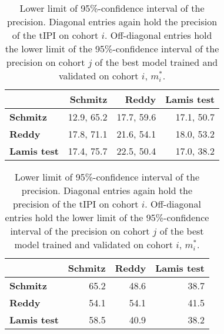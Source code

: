 \begin{table}
    \centering
    \begin{subtable}{\textwidth}
        \centering
        \begin{tabular}{lrrr}
            \hline
            & \textbf{Schmitz} & \textbf{Reddy} & \textbf{Lamis test} \\
            \hline
            \textbf{Schmitz} & \num{12.9}, \num{65.2} & \num{17.7}, \num{59.6} & \num{17.1}, \num{50.7} \\
            \textbf{Reddy} & \num{17.8}, \num{71.1} & \num{21.6}, \num{54.1} & \num{18.0}, \num{53.2} \\
            \textbf{Lamis test} & \num{17.4}, \num{75.7} & \num{22.5}, \num{50.4} & \num{17.0}, \num{38.2} \\
            \hline
        \end{tabular}
        \caption{Prevalence and precision.
            Diagonal entries $(i, i)$ hold prevalence, precision of the $\text{tIPI}$ on 
            cohort $i$. Off-diagonal entries $(i, j)$ hold prevalence, precision on cohort $j$ of 
            the best model trained and validated on cohort $i$, $m_i^*$.}\label{subtab:inter-prev-prec}
    \end{subtable}

    \vspace{0.5cm}
    \begin{subtable}{\textwidth}
        \centering
        \begin{tabular}{lrrr}
            \hline
            & \textbf{Schmitz} & \textbf{Reddy} & \textbf{Lamis test} \\
            \hline
            \textbf{Schmitz} & \num{65.2} & \num{48.6} & \num{38.7} \\
            \textbf{Reddy} & \num{54.1} & \num{54.1} & \num{41.5} \\
            \textbf{Lamis test} & \num{58.5} & \num{40.9} & \num{38.2} \\
            \hline
        \end{tabular}
        \caption{Lower limit of \num{95}\%-confidence interval of the precision.
            Diagonal entries again hold the precision of the $\text{tIPI}$ on cohort $i$. Off-diagonal 
            entries hold the lower limit of the \num{95}\%-confidence interval of the precision on 
            cohort $j$ of the best model trained and validated on cohort $i$, $m_i^*$.}
            \label{subtab:inter-prec-ci}
    \end{subtable}


\end{table}
